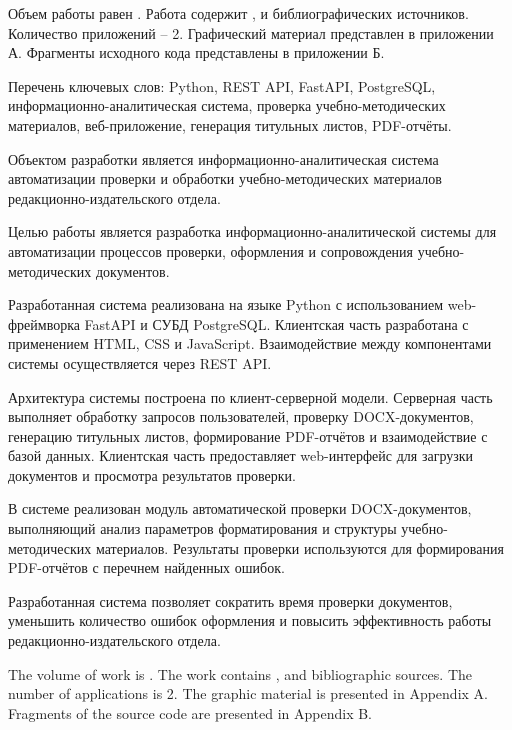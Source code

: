 
Объем работы равен . Работа содержит ,  
 и  библиографических источников. Количество приложений – 2. Графический материал представлен в приложении А. Фрагменты исходного кода представлены в приложении Б.

Перечень ключевых слов: Python, REST API, FastAPI, PostgreSQL,
информационно-аналитическая система, проверка учебно-методических материалов, веб-приложение, генерация титульных листов, PDF-отчёты.

Объектом разработки является информационно-аналитическая система автоматизации проверки и обработки учебно-методических материалов редакционно-издательского отдела.

Целью работы является разработка информационно-аналитической системы для автоматизации процессов проверки, оформления и сопровождения учебно-методических документов.

Разработанная система реализована на языке Python с использованием web-фреймворка FastAPI и СУБД PostgreSQL. Клиентская часть разработана с применением HTML, CSS и JavaScript. Взаимодействие между компонентами системы осуществляется через REST API.

Архитектура системы построена по клиент-серверной модели. Серверная часть выполняет обработку запросов пользователей, проверку DOCX-документов, генерацию титульных листов, формирование PDF-отчётов и взаимодействие с базой данных. Клиентская часть предоставляет web-интерфейс для загрузки документов и просмотра результатов проверки.

В системе реализован модуль автоматической проверки DOCX-документов, выполняющий анализ параметров форматирования и структуры учебно-методических материалов. Результаты проверки используются для формирования PDF-отчётов с перечнем найденных ошибок.

Разработанная система позволяет сократить время проверки документов, уменьшить количество ошибок оформления и повысить эффективность работы редакционно-издательского отдела.


		
	
	
The volume of work is . The work contains , and  bibliographic sources. The number of applications is 2. The graphic material is presented in Appendix A. Fragments of the source code are presented in Appendix B.

